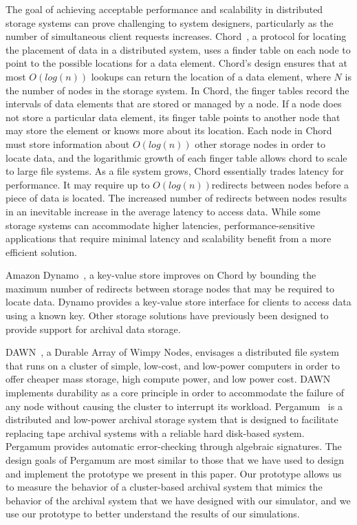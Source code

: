 The goal of achieving acceptable performance and scalability in distributed storage systems can prove challenging to system designers, particularly as the number of simultaneous client requests increases.  Chord~\cite{ref2}, a protocol for locating the placement of data in a distributed system, uses a finder table on each node to point to the possible locations for a data element.  Chord's design ensures that at most $O(log (n))$ lookups can return the location of a data element, where $N$ is the number of nodes in the storage system.  In Chord, the finger tables record the intervals of data elements that are stored or managed by a node.  If a node does not store a particular data element, its finger table points to another node that may store the element or knows more about its location.  Each node in Chord must store information about $O(log(n))$ other storage nodes in order to locate data, and the logarithmic growth of each finger table allows chord to scale to large file systems.  As a file system grows, Chord essentially trades latency for performance.  It may require up to $O(log(n))$redirects between nodes before a piece of data is located.  The increased number of redirects between nodes results in an inevitable increase in the average latency to access data.  While some storage systems can accommodate higher latencies, performance-sensitive applications that require minimal latency and scalability benefit from a more efficient solution.

Amazon Dynamo~\cite{ref3}, a key-value store improves on Chord by bounding the maximum number of redirects between storage nodes that may be required to locate data.  Dynamo provides a key-value store interface for clients to access data using a known key.  Other storage solutions have previously been designed to provide support for archival data storage.

DAWN~\cite{adams-ssrctr-11-07}, a Durable Array of Wimpy Nodes, envisages a distributed file system that runs on a cluster of simple, low-cost, and low-power computers in order to offer cheaper mass storage, high compute power, and low power cost.  DAWN implements durability as a core principle in order to accommodate the failure of any node without causing the cluster to interrupt its workload.  Pergamum~\cite{storer:fast08} is a distributed and low-power archival storage system that is designed to facilitate replacing tape archival systems with a reliable hard disk-based system.  Pergamum provides automatic error-checking through algebraic signatures.  The design goals of Pergamum are most similar to those that we have used to design and implement the prototype we present in this paper.  Our prototype allows us to measure the behavior of a cluster-based archival system that mimics the behavior of the archival system that we have designed with our simulator, and we use our prototype to better understand the results of our simulations.

